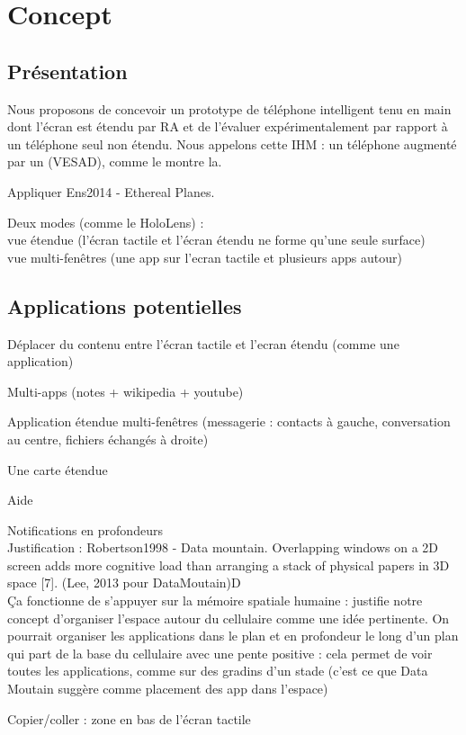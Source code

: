 \chapter{Concept}
\label{ch:concept}

\section{Présentation}

Nous proposons de concevoir un prototype de téléphone intelligent tenu en main dont l'écran est étendu par RA et de l'évaluer expérimentalement par rapport à un téléphone seul non étendu. Nous appelons cette IHM : un téléphone augmenté par un  (VESAD), comme le montre la.


Appliquer Ens2014 - Ethereal Planes.

Deux modes (comme le HoloLens) :\\
vue étendue (l'écran tactile et l'écran étendu ne forme qu'une seule surface)\\
vue multi-fenêtres (une app sur l'ecran tactile et plusieurs apps autour)

\section{Applications potentielles}
Déplacer du contenu entre l'écran tactile et l'ecran étendu (comme une application)

Multi-apps (notes + wikipedia + youtube)

Application étendue multi-fenêtres (messagerie : contacts à gauche, conversation au centre, fichiers échangés à droite)


Une carte étendue


Aide


Notifications en profondeurs\\
Justification : Robertson1998 - Data mountain.  Overlapping windows on a 2D screen adds more cognitive load than arranging a stack of physical papers in  3D space [7]. (Lee, 2013 pour DataMoutain)D\\
Ça fonctionne de s'appuyer sur la mémoire spatiale humaine : justifie notre concept d'organiser l'espace autour du cellulaire comme une idée pertinente. On pourrait organiser les applications dans le plan et en profondeur le long d'un plan qui part de la base du cellulaire avec une pente positive : cela permet de voir toutes les applications, comme sur des gradins d'un stade (c'est ce que Data Moutain suggère comme placement des app dans l'espace)

Copier/coller : zone en bas de l'écran tactile
